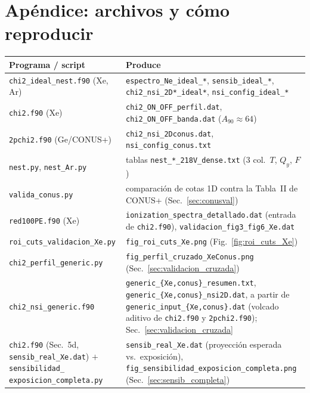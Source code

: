 \documentclass[11pt,a4paper]{article}
\newcommand{\Tnr}{T}
\newcommand{\code}[1]{\texttt{#1}}
\begin{document}
\section*{Ap\'endice: archivos y c\'omo reproducir}

\begin{center}
\footnotesize
\renewcommand{\arraystretch}{1.25}
\begin{tabular}{@{}>{\raggedright\arraybackslash}p{4.4cm}>{\raggedright\arraybackslash}p{10.2cm}@{}}
\toprule
Programa / script & Produce \\
\midrule
\code{chi2\_ideal\_nest.f90} \newline (Xe, Ar) &
  \code{espectro\_Ne\_ideal\_*}, \code{sensib\_ideal\_*},
  \code{chi2\_nsi\_2D*\_ideal*}, \code{nsi\_config\_ideal\_*} \\
\code{chi2.f90} (Xe) &
  \code{chi2\_ON\_OFF\_perfil.dat}, \code{chi2\_ON\_OFF\_banda.dat}
  ($A_{90}\approx 64$) \\
\code{2pchi2.f90} (Ge/CONUS+) &
  \code{chi2\_nsi\_2Dconus.dat}, \code{nsi\_config\_conus.txt} \\
\code{nest.py}, \code{nest\_Ar.py} &
  tablas \code{nest\_*\_218V\_dense.txt} (3 col.\ $\Tnr$, $Q_{y}$, $F$) \\
\code{valida\_conus.py} &
  comparaci\'on de cotas 1D contra la Tabla~II de CONUS+
  (Sec.~\ref{sec:conusval}) \\
\code{red100PE.f90} (Xe) &
  \code{ionization\_spectra\_detallado.dat} (entrada de \code{chi2.f90}),
  \code{validacion\_fig3\_fig6\_Xe.dat} \\
\code{roi\_cuts\_validacion\_Xe.py} &
  \code{fig\_roi\_cuts\_Xe.png} (Fig.~\ref{fig:roi_cuts_Xe}) \\
\code{chi2\_perfil\_generic.py} &
  \code{fig\_perfil\_cruzado\_XeConus.png} (Sec.~\ref{sec:validacion_cruzada}) \\
\code{chi2\_nsi\_generic.f90} &
  \code{generic\_\{Xe,conus\}\_resumen.txt},
  \code{generic\_\{Xe,conus\}\_nsi2D.dat}, a partir de
  \code{generic\_input\_\{Xe,conus\}.dat} (volcado aditivo de \code{chi2.f90} y
  \code{2pchi2.f90}); Sec.~\ref{sec:validacion_cruzada} \\
\code{chi2.f90} (Sec.~5d, \code{sensib\_real\_Xe.dat}) $+$
  \code{sensibilidad\_} \code{exposicion\_completa.py} &
  \code{sensib\_real\_Xe.dat} (proyecci\'on esperada vs.\ exposici\'on),
  \code{fig\_sensibilidad\_exposicion\_completa.png} (Sec.~\ref{sec:sensib_completa}) \\

\end{tabular}
\end{center}
\end{document}
